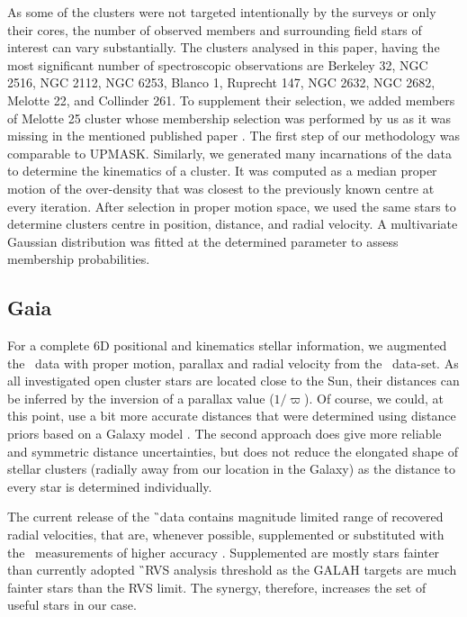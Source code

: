 As some of the clusters were not targeted intentionally by the surveys or only their cores, the number of observed members and surrounding field stars of interest can vary substantially. The clusters analysed in this paper, having the most significant number of spectroscopic observations are Berkeley 32, NGC 2516, NGC 2112, NGC 6253, Blanco 1, Ruprecht 147, NGC 2632, NGC 2682,  Melotte 22, and Collinder 261. To supplement their selection, we added members of Melotte 25 cluster whose membership selection was performed by us as it was missing in the mentioned published paper \cite{2018A&A...618A..93C}. The first step of our methodology was comparable to UPMASK. Similarly, we generated many incarnations of the data to determine the kinematics of a cluster. It was computed as a median proper motion of the over-density that was closest to the previously known centre at every iteration. After selection in proper motion space, we used the same stars to determine clusters centre in position, distance, and radial velocity. A multivariate Gaussian distribution was fitted at the determined parameter to assess membership probabilities.

\subsection{Gaia}
\label{sec:gaia_clusters}
For a complete 6D positional and kinematics stellar information, we augmented the \Gh\ data with proper motion, parallax and radial velocity from the \Gs\ data-set. As all investigated open cluster stars are located close to the Sun, their distances can be inferred by the inversion of a parallax value ($1 / \varpi$). Of course, we could, at this point, use a bit more accurate distances that were determined using distance priors based on a Galaxy model \cite{2018AJ....156...58B}. The second approach does give more reliable and symmetric distance uncertainties, but does not reduce the elongated shape of stellar clusters (radially away from our location in the Galaxy) as the distance to every star is determined individually.

The current release of the \G\ data contains magnitude limited range of recovered radial velocities, that are, whenever possible, supplemented or substituted with the \Gh\ measurements of higher accuracy \cite{2018arXiv180406344Z}. Supplemented are mostly stars fainter than currently adopted \G\ RVS \cite{2018A&A...616A...5C} analysis threshold as the GALAH targets are much fainter stars than the RVS limit. The synergy, therefore, increases the set of useful stars in our case.

